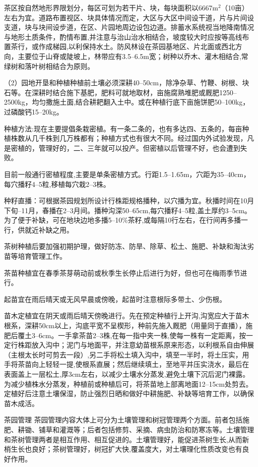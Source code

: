 \documentclass{ctexbook}
\begin{document}
茶区按自然地形界限划分，每区可划为若干片、块，每块面积以6667m$^2$（10亩）左右为宜。道路布置视区、块具体情况而定，大区与大区中间设干道，片与片间设支道，块与块间设步道，在区、片园地周边设包边道。排蓄水系统视当地降南情况与地形土质条件，酌情布置,并注意与治山治水相结合，坡度较大时应按等高线布置茶行，或作成梯园,以利保持水土。防风林设在茶园基地区、片北面或西北方向，主要位于山脊或陡坡上，林带应有3.5--6.5m宽；树种以乔木、灌木相结合,常绿树和落叶树相结合为原则。

（2）园地开垦和种植种植前土壤必须深耕40--50cm，除净杂草、竹鞭、树根、块石等。在深耕时结合施下基肥，肥料可就地取材，亩施腐熟堆肥或厩肥1250--2500kg，均匀撒施土面,结合耕耙翻入土中。或在种植行底下亩施饼肥50--100kg，过磷酸钙15--20kg。

种植方法:现在主要提倡条栽密植。有一条二条的，也有多达四、五条的，每亩种植株数从几千株到几万株都有；种植方式也有很大不同。经过国内外试验发现，凡是密植的，管理好的，二、三年就可以投产。但密植以后管理不好，也会遭到失败。

目前一般通行密植程度,主要是单条密植方式。行距1.5--1.65m，穴距为35--40cm，每穴播籽4--5粒,移植每穴栽2--3株。

种籽直播：可根据茶园规划所设计行株距规格播种，以穴播为宜。秋播时间在10月下旬--11月，春播在2--3月间。播种沟深50--65cm,每穴播籽4--5粒,盖土厚约3--5cm。为了便于补缺，可在地块边地多播5--10\%茶籽,或每隔10行左右，在行间再多播一行，供就近补缺之用。

茶树种植后要加强初期护理，做好防冻、防旱、除草、松土、施肥、补缺和淘汰劣苗等培育管理工作。

茶苗种植宜在春季茶芽萌动前或秋季生长停止后进行为好，但也可在梅雨季节进行。

起苗宜在雨后晴天或无风早晨或傍晚，起苗时注意根际多带土、少伤根。

苗木定植宜在阴天或雨后晴天傍晚进行。先在预定种植行上开沟,沟宽应大于苗木根系，深耕50cm以上，沟底平宽不呈楔形，种前先施入厩肥（用量同于直播），施肥后覆土3--6cm。一手拿茶苗2--3株,在每一指中夹一株,使每一株有一定距离，按一定行株距放入沟中；泥门与地面平，并注意幼苗根系原来形态，以利根系自由伸展（主根太长时可剪去一段）,另二手将松土填入沟中，填至一半时，将土压实，用手将茶苗向上轻轻一提,使根系直展；然后继续填土，至地平并压实浇水，最后在表面盖上一层松土,厚3cm左右，以减少土壤水分蒸发,避免土壤下沉后泥门裸露。为减少植株水分蒸发，种植前或种植后可，将茶苗地上部离地面12--15cm处剪去。定植好后注意土壤保湿，防止强烈日晒和做好中耕施肥、补缺等培育工作，以确保苗木成活。

茶园管理 茶园管理内容大体上可分为土壤管理和树冠管理两个方面。前者包括施肥、耕锄、铺草和灌溉等；后者包括修剪、采摘、病虫防治和防寒冻等。土壤管理和茶树管理两者是相互作用、相互促进的。土壤管理好，能促进茶树生长,从而新梢生长也良好；茶树管理好，树冠扩大快,覆盖度大，对土壤理化性质改变也有良好作用。
\end{document}
